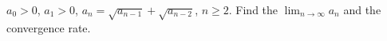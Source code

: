 $a_0 > 0$, $a_1 > 0$, $a_n = \sqrt{a_{n-1}} + \sqrt{a_{n-2}}$, $n \geq 2$. Find the $\lim_{n\to\infty} a_n$ and the convergence rate.
